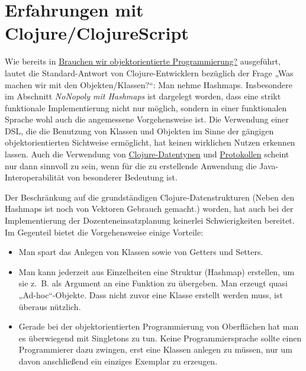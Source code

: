 \documentclass[11pt]{article}
\begin{document}
\section*{Erfahrungen mit Clojure/ClojureScript}
\label{sec:org9510fa9}
Wie bereits in \href{https://www.dropbox.com/s/36vsbdk1bn4w17o/oop-wozu.pdf?dl=0}{Brauchen wir objektorientierte Programmierung?}
ausgeführt, lautet die Standard-Antwort von Clojure-Entwicklern
bezüglich der Frage „Was machen wir mit den Objekten/Klassen?“: Man
nehme Hashmaps. Insbesondere im Abschnitt \emph{NoNopoly mit Hashmaps} ist
dargelegt worden, dass eine strikt funktionale Implementierung nicht
nur möglich, sondern in einer funktionalen Sprache wohl auch die
angemessene Vorgehensweise ist. Die Verwendung einer DSL, die die
Benutzung von Klassen und Objekten im Sinne der gängigen
objektorientierten Sichtweise ermöglicht, hat keinen wirklichen Nutzen
erkennen lassen. Auch die Verwendung von \href{https://clojure.org/reference/datatypes}{Clojure-Datentypen} und
\href{https://clojure.org/reference/protocols}{Protokollen} scheint nur dann sinnvoll zu sein, wenn für die zu
erstellende Anwendung die Java-Interoperabilität von besonderer
Bedeutung ist.

Der Beschränkung auf die grundständigen Clojure-Datenstrukturen (Neben
den Hashmaps ist noch von Vektoren Gebrauch gemacht.) worden, hat auch bei
der Implementierung der Dozenteneinsatzplanung keinerlei
Schwierigkeiten bereitet. Im Gegenteil bietet die Vorgehensweise
einige Vorteile:

\begin{itemize}
\item Man spart das Anlegen von Klassen sowie von Getters und Setters.
\item Man kann jederzeit aus Einzelheiten eine Struktur (Hashmap)
erstellen, um sie z.~B. als Argument an eine Funktion zu
übergeben. Man erzeugt quasi „Ad-hoc“-Objekte. Dass nicht zuvor eine
Klasse erstellt werden muss, ist überaus nützlich.
\item Gerade bei der objektorientierten Programmierung von Oberflächen hat man
es überwiegend mit Singletons zu tun. Keine Programmiersprache
sollte einen Programmierer dazu zwingen, erst eine Klassen anlegen
zu müssen, nur um davon anschließend ein einziges Exemplar zu erzeugen.
\end{itemize}
\end{document}
